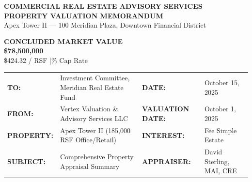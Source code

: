 \documentclass[10pt,a4paper]{scrartcl}
\begin{document}

\begin{tcolorbox}[
  enhanced,
  colback=navyprimary,
  colframe=navyprimary,
  arc=5pt,
  top=8pt, bottom=8pt, left=12pt, right=12pt
]
  \begin{minipage}[c]{0.68\textwidth}
    {\color{lightteal}\sffamily\bfseries\tiny \faBuilding\quad COMMERCIAL REAL ESTATE ADVISORY SERVICES}\\[2pt]
    {\color{white}\sffamily\bfseries\LARGE PROPERTY VALUATION MEMORANDUM}\\[2pt]
    {\color{bordergray}\sffamily\scriptsize \faMapMarker*\quad Apex Tower II --- 100 Meridian Plaza, Downtown Financial District}
  \end{minipage}%
  \hfill
  \begin{minipage}[c]{0.28\textwidth}
    \begin{tcolorbox}[
      colback=tealaccent,
      colframe=tealaccent,
      arc=4pt,
      halign=center, valign=center,
      top=4pt, bottom=4pt
    ]
      {\color{white}\sffamily\bfseries\tiny CONCLUDED MARKET VALUE}\\[1pt]
      {\color{white}\sffamily\bfseries\Large \$78,500,000}\\[1pt]
      {\color{white}\sffamily\tiny \$424.32 / RSF \;|\% Cap Rate}
    \end{tcolorbox}
  \end{minipage}
\end{tcolorbox}

\vspace{2pt}

\begin{tcolorbox}[memocard]
  \small
  \begin{tabularx}{\textwidth}{@{}l X l X@{}}
    \textbf{\color{navyprimary}TO:} & Investment Committee, Meridian Real Estate Fund & \textbf{\color{navyprimary}DATE:} & October 15, 2025 \\
    \textbf{\color{navyprimary}FROM:} & Vertex Valuation \& Advisory Services LLC & \textbf{\color{navyprimary}VALUATION DATE:} & October 1, 2025 \\
    \textbf{\color{navyprimary}PROPERTY:} & Apex Tower II (185,000 RSF Office/Retail) & \textbf{\color{navyprimary}INTEREST:} & Fee Simple Estate \\
    \textbf{\color{navyprimary}SUBJECT:} & Comprehensive Property Appraisal Summary & \textbf{\color{navyprimary}APPRAISER:} & David Sterling, MAI, CRE \\
  \end{tabularx}
\end{tcolorbox}
\end{document}
